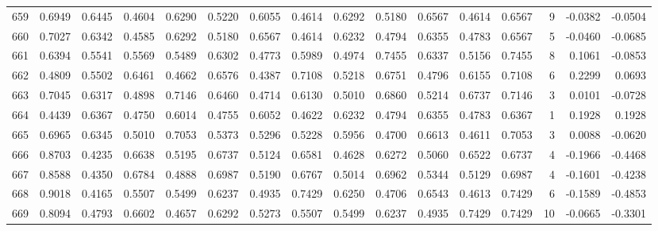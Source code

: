 \begin{tabular}{lrrrrrrrrrrrrrrr}
659 &      0.6949 &  0.6445 &  0.4604 &  0.6290 &  0.5220 &  0.6055 &  0.4614 &  0.6292 &  0.5180 &  0.6567 &   0.4614 &     0.6567 &      9 &                   -0.0382 &                    -0.0504 \\
660 &      0.7027 &  0.6342 &  0.4585 &  0.6292 &  0.5180 &  0.6567 &  0.4614 &  0.6232 &  0.4794 &  0.6355 &   0.4783 &     0.6567 &      5 &                   -0.0460 &                    -0.0685 \\
661 &      0.6394 &  0.5541 &  0.5569 &  0.5489 &  0.6302 &  0.4773 &  0.5989 &  0.4974 &  0.7455 &  0.6337 &   0.5156 &     0.7455 &      8 &                    0.1061 &                    -0.0853 \\
662 &      0.4809 &  0.5502 &  0.6461 &  0.4662 &  0.6576 &  0.4387 &  0.7108 &  0.5218 &  0.6751 &  0.4796 &   0.6155 &     0.7108 &      6 &                    0.2299 &                     0.0693 \\
663 &      0.7045 &  0.6317 &  0.4898 &  0.7146 &  0.6460 &  0.4714 &  0.6130 &  0.5010 &  0.6860 &  0.5214 &   0.6737 &     0.7146 &      3 &                    0.0101 &                    -0.0728 \\
664 &      0.4439 &  0.6367 &  0.4750 &  0.6014 &  0.4755 &  0.6052 &  0.4622 &  0.6232 &  0.4794 &  0.6355 &   0.4783 &     0.6367 &      1 &                    0.1928 &                     0.1928 \\
665 &      0.6965 &  0.6345 &  0.5010 &  0.7053 &  0.5373 &  0.5296 &  0.5228 &  0.5956 &  0.4700 &  0.6613 &   0.4611 &     0.7053 &      3 &                    0.0088 &                    -0.0620 \\
666 &      0.8703 &  0.4235 &  0.6638 &  0.5195 &  0.6737 &  0.5124 &  0.6581 &  0.4628 &  0.6272 &  0.5060 &   0.6522 &     0.6737 &      4 &                   -0.1966 &                    -0.4468 \\
667 &      0.8588 &  0.4350 &  0.6784 &  0.4888 &  0.6987 &  0.5190 &  0.6767 &  0.5014 &  0.6962 &  0.5344 &   0.5129 &     0.6987 &      4 &                   -0.1601 &                    -0.4238 \\
668 &      0.9018 &  0.4165 &  0.5507 &  0.5499 &  0.6237 &  0.4935 &  0.7429 &  0.6250 &  0.4706 &  0.6543 &   0.4613 &     0.7429 &      6 &                   -0.1589 &                    -0.4853 \\
669 &      0.8094 &  0.4793 &  0.6602 &  0.4657 &  0.6292 &  0.5273 &  0.5507 &  0.5499 &  0.6237 &  0.4935 &   0.7429 &     0.7429 &     10 &                   -0.0665 &                    -0.3301 \\

\end{tabular}
